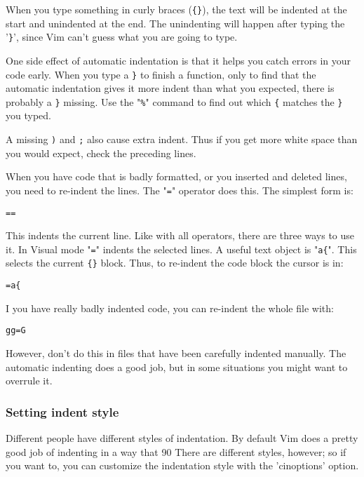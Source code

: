 When you type something in curly braces (\verb!{}!), the text will be indented at the start and unindented at the end.
The unindenting will happen after typing the '\verb!}!', since Vim can't guess what you are going to type.

One side effect of automatic indentation is that it helps you catch errors in your code early.
When you type a \verb!}! to finish a function, only to find that the automatic indentation gives it more indent than what you expected, there is probably a \verb!}! missing.
Use the "\verb!%!" command to find out which \verb!{! matches the \verb!}! you typed.

A missing \verb!)! and \verb!;! also cause extra indent.
Thus if you get more white space than you would expect, check the preceding lines.

When you have code that is badly formatted, or you inserted and deleted lines, you need to re-indent the lines.
The "\verb!=!" operator does this.
The simplest form is:

\begin{Verbatim}[samepage=true]
 ==
\end{Verbatim}

This indents the current line.
Like with all operators, there are three ways to use it.
In Visual mode "\verb!=!" indents the selected lines.
A useful text object is "\verb!a{!".
This selects the current \verb!{}! block.
Thus, to re-indent the code block the cursor is in:

\begin{Verbatim}[samepage=true]
 =a{
\end{Verbatim}

I you have really badly indented code, you can re-indent the whole file with:

\begin{Verbatim}[samepage=true]
 gg=G
\end{Verbatim}

However, don't do this in files that have been carefully indented manually.
The automatic indenting does a good job, but in some situations you might want to overrule it.
\subsubsection{Setting indent style}
Different people have different styles of indentation.
By default Vim does a pretty good job of indenting in a way that 90%
There are different styles, however; so if you want to, you can customize the indentation style with the 'cinoptions' option.

